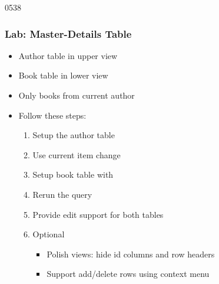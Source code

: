\begin{slide}{0538}\frametitle{Lab: Master-Details Table}
\begin{itemize}
\item Author table in upper view
\item Book table in lower view
\item Only books from current author
\item Follow these steps:
  \begin{enumerate}
  \item Setup the author table
  \item Use current item change
  \item Setup book table with 
  \item Rerun the query
  \item Provide edit support for both tables
  \item Optional
    \begin{itemize}
    \item Polish views: hide  id columns and row headers
    \item Support add/delete rows using context menu
    \end{itemize}
 \end{enumerate}
\end{itemize}
\end{slide}
